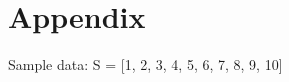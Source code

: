 \appendix
\renewcommand{\appendixtocname}{Appendix}
\addappheadtotoc
\pagestyle{appendix}
\setcounter{table}{0}
\renewcommand{\thetable}{A\arabic{table}}
\setcounter{figure}{0}
\renewcommand{\thefigure}{A\arabic{figure}}
\chapter*{Appendix}
Sample data:
S = [1, 2, 3, 4, 5, 6, 7, 8, 9, 10]